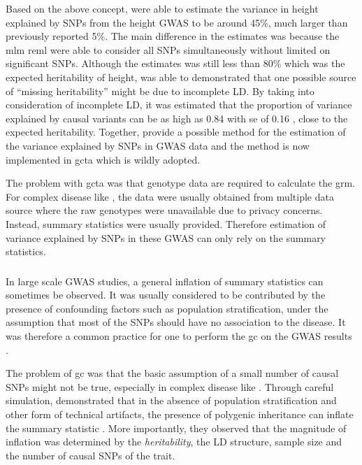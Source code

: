 	Based on the above concept, \citet{Yang2010a} were able to estimate the variance in height explained by \glspl{SNP} from the height \gls{GWAS} to be around 45\%, much larger than previously reported 5\%.
	The main difference in the estimates was because the \gls{mlm} \gls{reml} were able to consider all \glspl{SNP} simultaneously without limited on significant \glspl{SNP}.
	Although the estimates was still less than 80\% which was the expected heritability of height, \citet{Yang2010a} was able to demonstrated that one possible source of ``missing heritability'' might be due to incomplete \gls{LD}.
	By taking into consideration of incomplete \gls{LD}, it was estimated that the proportion of variance explained by causal variants can be as high as 0.84 with \gls{se} of 0.16 \citep{Yang2010a}, close to the expected heritability.
	Together, \citet{Yang2011} provide a possible method for the estimation of the variance explained by \glspl{SNP} in \gls{GWAS} data and the method is now implemented in \gls{gcta} which is wildly adopted.
	
	The problem with \gls{gcta} was that genotype data are required to calculate the \gls{grm}.
	For complex disease like , the data were usually obtained from multiple data source where the raw genotypes were unavailable due to privacy concerns.
	Instead, summary statistics were usually provided.
	Therefore estimation of variance explained by \glspl{SNP} in these \gls{GWAS} can only rely on the summary statistics. 
	
	\subsubsection{}
	In large scale \gls{GWAS} studies, a general inflation of summary statistics can sometimes be observed.
	It was usually considered to be contributed by the presence of confounding factors such as population stratification, under the assumption that most of the \glspl{SNP} should have no association to the disease.
	It was therefore a common practice for one to perform the \gls{gc} on the \gls{GWAS} results \citep{Zheng2006}.
	
	The problem of \gls{gc} was that the basic assumption of a small number of causal \glspl{SNP} might not be true, especially in complex disease like .
	Through careful simulation, \citet{Yang2011b} demonstrated that in the absence of population stratification and other form of technical artifacts, the presence of polygenic inheritance can inflate the summary statistic \citep{Yang2011b}.
	More importantly, they observed that the magnitude of inflation was determined by the \emph{heritability}, the \gls{LD} structure, sample size and the number of causal \glspl{SNP} of the trait.
	
